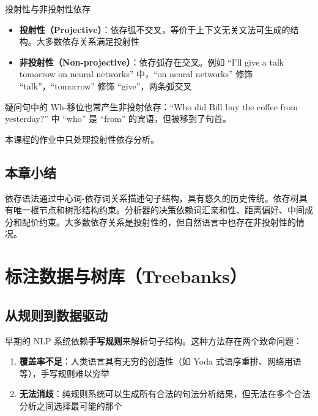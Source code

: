 \documentclass[a4paper]{article}
\begin{document}



\begin{importantbox}{投射性与非投射性依存}
\begin{itemize}
    \item \textbf{投射性（Projective）}：依存弧不交叉，等价于上下文无关文法可生成的结构。大多数依存关系满足投射性
    \item \textbf{非投射性（Non-projective）}：依存弧存在交叉。例如 ``I'll give a talk tomorrow on neural networks'' 中，``on neural networks'' 修饰 ``talk''，``tomorrow'' 修饰 ``give''，两条弧交叉
\end{itemize}
疑问句中的 Wh-移位也常产生非投射依存：``Who did Bill buy the coffee from yesterday?'' 中 ``who'' 是 ``from'' 的宾语，但被移到了句首。
\end{importantbox}

本课程的作业中只处理投射性依存分析。

\subsection{本章小结}

依存语法通过中心词-依存词关系描述句子结构，具有悠久的历史传统。依存树具有唯一根节点和树形结构约束。分析器的决策依赖词汇亲和性、距离偏好、中间成分和配价约束。大多数依存关系是投射性的，但自然语言中也存在非投射性的情况。


\section{标注数据与树库（Treebanks）}

\subsection{从规则到数据驱动}

早期的 NLP 系统依赖\textbf{手写规则}来解析句子结构。这种方法存在两个致命问题：

\begin{enumerate}
    \item \textbf{覆盖率不足}：人类语言具有无穷的创造性（如 Yoda 式语序重排、网络用语等），手写规则难以穷举
    \item \textbf{无法消歧}：纯规则系统可以生成所有合法的句法分析结果，但无法在多个合法分析之间选择最可能的那个
\end{enumerate}
\end{document}
